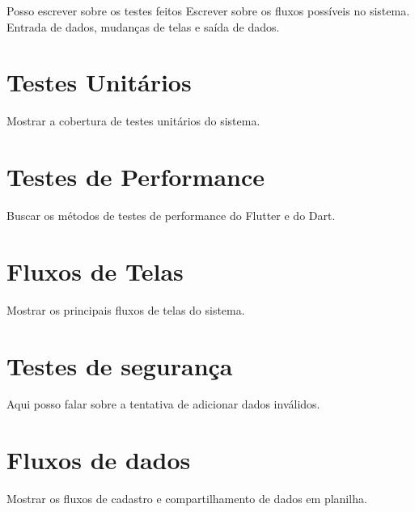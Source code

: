 
\label{Cap:ExperimentosResultados}

Posso escrever sobre os testes feitos
Escrever sobre os fluxos possíveis no sistema. Entrada de dados, mudanças de telas e saída de dados.

\section{Testes Unitários}
\label{Sec:TestesUnitarios}
Mostrar a cobertura de testes unitários do sistema.

\section{Testes de Performance}
\label{Sec:TestesPerformance}
Buscar os métodos de testes de performance do Flutter e do Dart.

\section{Fluxos de Telas}
\label{Sec:FluxosTelas}
Mostrar os principais fluxos de telas do sistema.

\section{Testes de segurança}
\label{Sec:TestesSeguranca}
Aqui posso falar sobre a tentativa de adicionar dados inválidos.

\section{Fluxos de dados}
\label{Sec:FluxosDados}
Mostrar os fluxos de cadastro e compartilhamento de dados em planilha.




